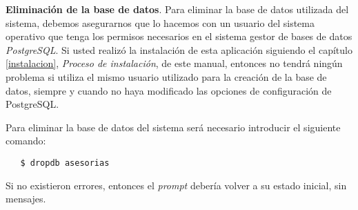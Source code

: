\item \textbf{Eliminación de la base de datos}.
  Para eliminar la base de datos utilizada del sistema, debemos asegurarnos que
  lo hacemos con un usuario del sistema operativo que tenga los permisos
  necesarios en el sistema gestor de bases de datos \textit{PostgreSQL}. Si
  usted realizó la instalación de esta aplicación siguiendo el capítulo
  \ref{instalacion}, \textit{Proceso de instalación}, de este manual, entonces
  no tendrá ningún problema si utiliza el mismo usuario utilizado para la
  creación de la base de datos, siempre y cuando no haya modificado las opciones
  de configuración de PostgreSQL.

  Para eliminar la base de datos del sistema será necesario introducir el
  siguiente comando:

   \begin{verbatim}
   $ dropdb asesorias
   \end{verbatim}

  Si no existieron errores, entonces el \textit{prompt} debería volver a su
  estado inicial, sin mensajes.